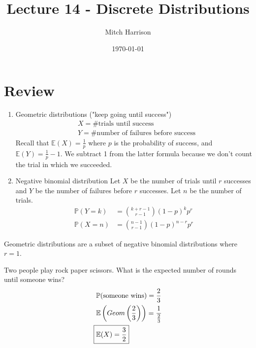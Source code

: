 \documentclass[titlepage, 12pt, leqno]{article}
\title{\Huge{Lecture 14 - Discrete Distributions}}
\author{\large{Mitch Harrison}}
\date{\today}
\begin{document}
\setlength{\parskip}{1\baselineskip}
\setlength{\parindent}{15pt}
\maketitle
\tableofcontents
\newpage


\section{Review}

\begin{enumerate}
    \item Geometric distributions ("keep going until success")
       \begin{align*}
           & X = \text{\# trials until success} \\
           & Y = \text{\# number of failures before success}
       \end{align*}
       Recall that $ \mathbb{E}(X) = \frac{1}{p}$ where $p$ is the probability of
       success, and $ \mathbb{E}(Y) = \frac{1}{p}-1$. We subtract 1 from the 
       latter formula because we don't count the trial in which we succeeded.

    \item Negative binomial distribution
        Let $X$ be the number of trials until $r$ successes and $Y$ be the number
        of failures before $r$ successes. Let $n$ be the number of trials.
       \begin{align*}
           \mathbb{P}(Y=k) &= \binom{k+r-1}{r-1}(1-p)^kp^r \\
           \mathbb{P}(X=n) &= \binom{n-1}{r-1}(1-p)^{n-r}p^r
       \end{align*}
\end{enumerate}

\begin{note}
    Geometric distributions are a subset of negative binomial distributions 
    where $r=1$.
\end{note}

\begin{ex}
    Two people play rock paper scissors. What is the expected number of rounds
    until someone wins?
    \vspace{10px}
   \begin{align*}
       & \mathbb{P}( \text{someone wins}) = \frac{2}{3} \\
       & \mathbb{E}\left(Geom\left(\frac{2}{3}\right)\right) = 
       \frac{1}{\frac{2}{3}} \\
       \Aboxed{& \mathbb{E}(X) = \frac{3}{2}} 
   \end{align*}
\end{ex}
\end{document}
